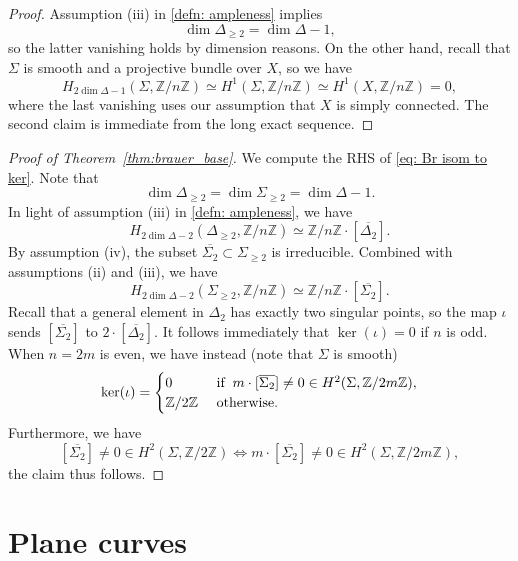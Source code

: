 \documentclass[11pt]{amsart}
\theoremstyle{plain}
\theoremstyle{definition}
\theoremstyle{remark}
\begin{document}
\begin{proof}
    Assumption (iii) in \ref{defn: ampleness} implies
    \[
    \dim \Delta_{\geq 2} = \dim \Delta -1,
    \]
    so the latter vanishing holds by dimension reasons. On the other hand, recall that $\Sigma$ is smooth and a projective bundle over $X$,
    so we have
    \[
    H_{2\dim\Delta -1}(\Sigma, \mathbb Z/ n \mathbb Z) \simeq H^1(\Sigma, \mathbb Z/ n \mathbb Z) \simeq H^1(X, \mathbb Z/ n \mathbb Z) = 0,
    \]
    where the last vanishing uses our assumption that $X$ is simply connected. The second claim is immediate from the long exact sequence.
\end{proof}

\begin{proof}[Proof of Theorem~\ref{thm:brauer_base}]
    We compute the RHS of \eqref{eq: Br isom to ker}. Note that
    \[
    \dim \Delta_{\geq 2} = \dim \Sigma_{\geq 2} = \dim \Delta -1.
    \]
    In light of assumption (iii) in \ref{defn: ampleness}, we have
    \[
    H_{2\dim \Delta -2}(\Delta_{\geq 2}, \mathbb Z/n \mathbb Z) \simeq \mathbb Z/ n\mathbb Z \cdot [\overline{\Delta_{2}}].
    \]
    By assumption (iv), the subset $\overline{\Sigma_{2}} \subset \Sigma_{\geq 2}$ is irreducible. Combined with assumptions (ii) and (iii), we have
    \[
    H_{2\dim \Delta -2}(\Sigma_{\geq 2}, \mathbb Z/n \mathbb Z) \simeq \mathbb Z/ n\mathbb Z \cdot [\overline{\Sigma_{2}}].
    \]
    Recall that a general element in $\Delta_2$ has exactly two singular points, so the map $\iota$ sends $[\overline{\Sigma_{2}}]$ to $2\cdot [\overline{\Delta_{2}}]$. It follows immediately that $\ker(\iota) = 0$ if $n$ is odd. When $n=2m$ is even, we have instead (note that $\Sigma$ is smooth)
    \[\ker(\iota) = \begin{cases}0 & \text{  if \:} m\cdot [\overline{\Sigma_{2}}] \neq 0 \in H^2(\Sigma, \mathbb Z / 2m \mathbb Z),\\ \mathbb Z / 2\mathbb Z & \text{  otherwise}.\end{cases}\]
    Furthermore, we have 
    \[
    [\overline{\Sigma_{2}}] \neq 0 \in H^2(\Sigma, \mathbb Z / 2 \mathbb Z) \Longleftrightarrow m\cdot [\overline{\Sigma_{2}}] \neq 0 \in H^2(\Sigma, \mathbb Z / 2m \mathbb Z),
    \]
    the claim thus follows.
    \end{proof}
    
    



\section{Plane curves}\label{sec: P2}
\end{document}
